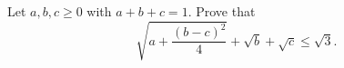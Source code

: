 Let $a,b,c\ge0$ with $a+b+c=1$. Prove that
\[\sqrt{a+\dfrac{(b-c)^2}{4}}+\sqrt b+\sqrt c\le\sqrt3.\]
